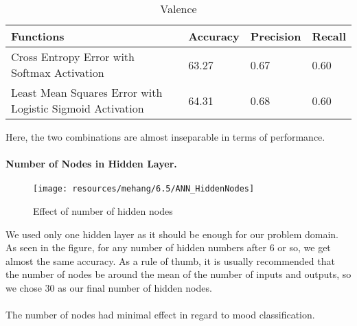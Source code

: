 \begin{table}[h!]
        \caption{Valence}
        \begin{center}
                \begin{tabular}{|l|l|l|l|}
                        \hline

                        Functions
                        &
                        Accuracy
                        &
                        Precision
                        &
                        Recall
                        \\\hline

                        Cross Entropy Error with Softmax Activation
                        &
                        63.27%
                        &
                        0.67
                        &
                        0.60
                        \\\hline
                        
                        Least Mean Squares Error with Logistic Sigmoid Activation 
                        &
                        64.31%
                        &
                        0.68
                        &
                        0.60
                        \\\hline

                 \end{tabular}
        \end{center}
\end{table}

Here, the two combinations are almost inseparable in terms of performance. 

\paragraph{Number of Nodes in Hidden Layer.}

\begin{figure}[h!]
        \centering
        \texttt{[image: resources/mehang/6.5/ANN\_HiddenNodes]}
        \caption{Effect of number of hidden nodes}
\end{figure}

We used only one hidden layer as it should be enough for our problem domain. 
As seen in the figure, for any number of hidden numbers after 6 or so, we get almost the same accuracy. As a rule of thumb, it is usually recommended that the number of nodes be around the mean of the number of inputs and outputs, so we chose 30 as our final number of hidden nodes.\\
\\
The number of nodes had minimal effect in regard to mood classification. 

